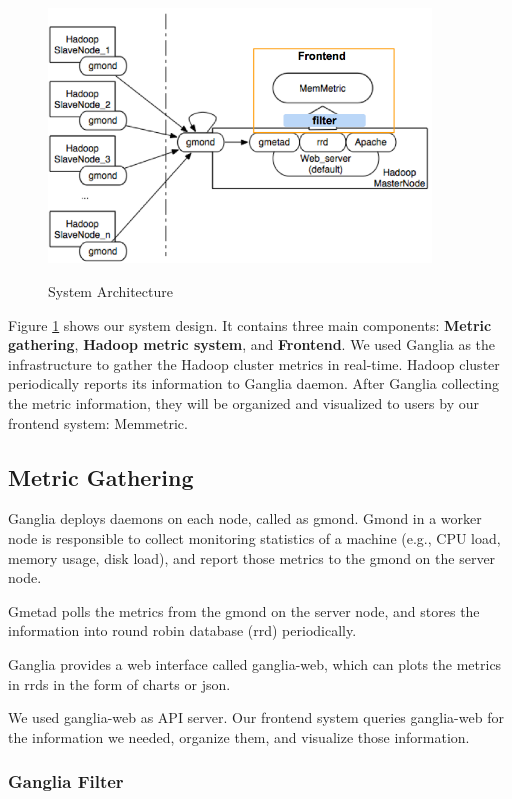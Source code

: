 \begin{figure}[ht]
  \caption{System Architecture}
  \centering
    \includegraphics[width=4.0in]{image/architecture.png}
    \label{ref-architecture}
\end{figure}

Figure \ref{ref-architecture} shows our system design. It contains three main components: \textbf{Metric gathering}, \textbf{Hadoop metric system}, and \textbf{Frontend}. We used Ganglia as the infrastructure to gather the  Hadoop cluster metrics in real-time. Hadoop cluster periodically reports its information to Ganglia daemon. After Ganglia collecting the metric information, they will be organized and visualized to users by our frontend system: Memmetric.

\subsection{Metric Gathering}

Ganglia deploys daemons on each node, called as gmond. Gmond in a worker node is responsible to collect monitoring statistics of a machine (e.g., CPU load, memory usage, disk load), and report those metrics to the gmond on the server node. 

Gmetad polls the metrics from the gmond on the server node, and stores the information into round robin database (rrd) periodically. 

Ganglia provides a web interface called ganglia-web, which can plots the metrics in rrds in the form of charts or json. 

We used ganglia-web as API server. Our frontend system queries ganglia-web for the information we needed, organize them, and visualize those information. 

\subsubsection{Ganglia Filter}

